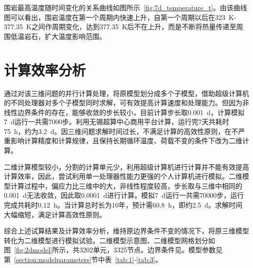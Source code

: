 围岩最高温度随时间变化的关系曲线如图所示~\ref{fig:7d_temperature_t}。由该曲线图可以看出，围岩温度在第一个周期内快速上升，自第一个周期以后在\SI{323}{K}-\SI{377.35}{K}之间作周期变化，达到\SI{377.35}{K}后不在上升，而是不断将热量传递至周围低温岩石，扩大温度影响范围。



\section{计算效率分析}
通过对该三维问题的并行计算处理，将原模型划分成多个子模型，借助超级计算机的不同处理器对多个子模型同时求解，可有效提高计算速度和处理能力。但因为非线性边界条件的存在，能够收敛的步长较小，目前计算步长取\SI{0.001}{d}，计算模拟\SI{7}{d}运行一共需7000步。利用无锡超算中心商用平台计算，运行完7天共耗时\SI{75}{h}，约为\SI{3.2}{d}。因三维问题求解时间过长，不满足计算的高效性原则，在不严重影响计算精度和计算规律，且保持长期循环温度、荷载不变的条件下改为二维计算。

二维计算模型较小，分割的计算单元少，利用超级计算机进行计算并不能有效提高计算效率，因此，尝试利用单一处理器性能力更强的个人计算机进行模拟。二维模型计算过程中，偏应力比三维中的大，非线性程度较高，步长取与三维中相同的\SI{0.001}{d}无法收敛，因此取\SI{0.0001}{d}进行计算。模拟\SI{7}{d}运行一共需70000步，运行完成共耗时\SI{0.12}{h}。当计算总时长为10年，预计需\SI{60.8}{h}，即约\SI{2.5}{d}。求解时间大幅缩短，满足计算高效性原则。

综合上述试算结果及计算效率分析，维持原边界条件不变的情况下，将原三维模型转化为二维模型进行模拟试验。二维模型示意图、二维模型网格划分如图~\ref{fig:2dmodel}所示，共3202单元，3325节点。边界条件见。模型参数见第~\ref{section:modelparameters}节中表~\ref{tab:1}-\ref{tab:3}。

